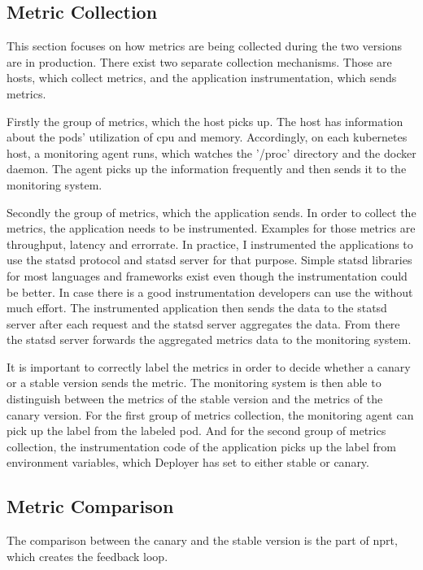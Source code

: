 \subsection{Metric Collection}

This section focuses on how metrics are being collected during the two versions are in
production. There exist two separate collection mechanisms. Those are hosts, which collect
metrics, and the application instrumentation, which sends metrics.

Firstly the group of metrics, which the host picks up. The host has information about the
pods' utilization of cpu and memory. Accordingly, on each kubernetes host, a monitoring
agent runs, which watches the '/proc' directory and the docker daemon. The agent picks up
the information frequently and then sends it to the monitoring system.

Secondly the group of metrics, which the application sends. In order to collect the
metrics, the application needs to be instrumented. Examples for those metrics are
throughput, latency and errorrate. In practice, I instrumented the applications to use the
statsd protocol and statsd server for that purpose. Simple statsd libraries for most
languages and frameworks exist even though the instrumentation could be better. In case
there is a good instrumentation developers can use the without much effort. The
instrumented application then sends the data to the statsd server after each request and
the statsd server aggregates the data. From there the statsd server forwards the
aggregated metrics data to the monitoring system.

It is important to correctly label the metrics in order to decide whether a canary or a
stable version sends the metric. The monitoring system is then able to distinguish between
the metrics of the stable version and the metrics of the canary version. For the first
group of metrics collection, the monitoring agent can pick up the label from the labeled
pod. And for the second group of metrics collection, the instrumentation code of the
application picks up the label from environment variables, which Deployer has set to
either stable or canary.

\subsection{Metric Comparison}
\label{sec:metric_comparison}

The comparison between the canary and the stable version is the part of \gls{nprt}, which
creates the feedback loop.

